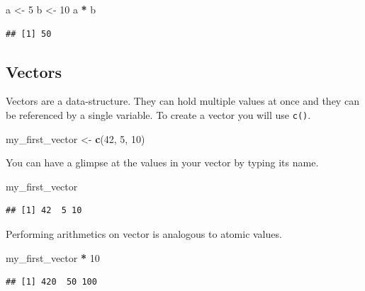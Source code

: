 \documentclass[]{book}
\newenvironment{Shaded}{\begin{snugshade}}{\end{snugshade}}
\newcommand{\KeywordTok}[1]{\textcolor[rgb]{0.13,0.29,0.53}{\textbf{#1}}}
\newcommand{\DecValTok}[1]{\textcolor[rgb]{0.00,0.00,0.81}{#1}}
\newcommand{\StringTok}[1]{\textcolor[rgb]{0.31,0.60,0.02}{#1}}
\newcommand{\OperatorTok}[1]{\textcolor[rgb]{0.81,0.36,0.00}{\textbf{#1}}}
\newcommand{\NormalTok}[1]{#1}
\theoremstyle{definition}
\theoremstyle{definition}
\theoremstyle{definition}
\theoremstyle{remark}
\begin{document}
\begin{Shaded}
\begin{Highlighting}[]
\NormalTok{a <-}\StringTok{ }\DecValTok{5}
\NormalTok{b <-}\StringTok{ }\DecValTok{10}
\NormalTok{a }\OperatorTok{*}\StringTok{ }\NormalTok{b}
\end{Highlighting}
\end{Shaded}

\begin{verbatim}
## [1] 50
\end{verbatim}

\subsection{Vectors}\label{vectors}

Vectors are a data-structure. They can hold multiple values at once and
they can be referenced by a single variable. To create a vector you will
use \texttt{c()}.

\begin{Shaded}
\begin{Highlighting}[]
\NormalTok{my_first_vector <-}\StringTok{ }\KeywordTok{c}\NormalTok{(}\DecValTok{42}\NormalTok{, }\DecValTok{5}\NormalTok{, }\DecValTok{10}\NormalTok{)}
\end{Highlighting}
\end{Shaded}

You can have a glimpse at the values in your vector by typing its name.

\begin{Shaded}
\begin{Highlighting}[]
\NormalTok{my_first_vector}
\end{Highlighting}
\end{Shaded}

\begin{verbatim}
## [1] 42  5 10
\end{verbatim}

Performing arithmetics on vector is analogous to atomic values.

\begin{Shaded}
\begin{Highlighting}[]
\NormalTok{my_first_vector }\OperatorTok{*}\StringTok{ }\DecValTok{10}
\end{Highlighting}
\end{Shaded}

\begin{verbatim}
## [1] 420  50 100
\end{verbatim}
\end{document}
